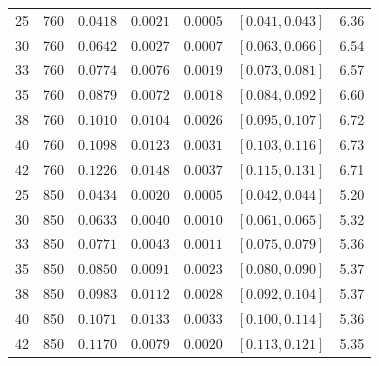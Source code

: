 \documentclass[11pt]{article}
\def\,{ }%
\begin{document}
\begin{table}[ht]
\begin{tabular}{@{}ccccccc@{}}
\midrule
25 & 760 & $0.0418$ & $0.0021$ & $0.0005$ & $[0.041,\,0.043]$ & 6.36 \\
30 & 760 & $0.0642$ & $0.0027$ & $0.0007$ & $[0.063,\,0.066]$ & 6.54 \\
33 & 760 & $0.0774$ & $0.0076$ & $0.0019$ & $[0.073,\,0.081]$ & 6.57 \\
35 & 760 & $0.0879$ & $0.0072$ & $0.0018$ & $[0.084,\,0.092]$ & 6.60 \\
38 & 760 & $0.1010$ & $0.0104$ & $0.0026$ & $[0.095,\,0.107]$ & 6.72 \\
40 & 760 & $0.1098$ & $0.0123$ & $0.0031$ & $[0.103,\,0.116]$ & 6.73 \\
42 & 760 & $0.1226$ & $0.0148$ & $0.0037$ & $[0.115,\,0.131]$ & 6.71 \\
\midrule
25 & 850 & $0.0434$ & $0.0020$ & $0.0005$ & $[0.042,\,0.044]$ & 5.20 \\
30 & 850 & $0.0633$ & $0.0040$ & $0.0010$ & $[0.061,\,0.065]$ & 5.32 \\
33 & 850 & $0.0771$ & $0.0043$ & $0.0011$ & $[0.075,\,0.079]$ & 5.36 \\
35 & 850 & $0.0850$ & $0.0091$ & $0.0023$ & $[0.080,\,0.090]$ & 5.37 \\
38 & 850 & $0.0983$ & $0.0112$ & $0.0028$ & $[0.092,\,0.104]$ & 5.37 \\
40 & 850 & $0.1071$ & $0.0133$ & $0.0033$ & $[0.100,\,0.114]$ & 5.36 \\
42 & 850 & $0.1170$ & $0.0079$ & $0.0020$ & $[0.113,\,0.121]$ & 5.35 \\
\bottomrule
\end{tabular}
\end{table}
\end{document}
